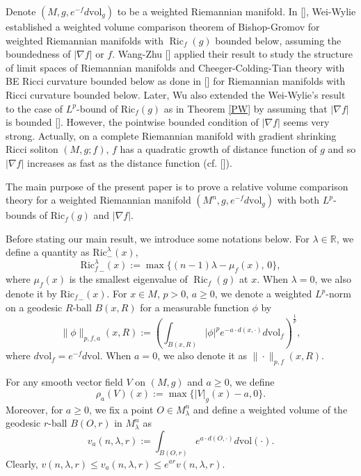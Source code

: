 \documentclass[11pt]{amsart}
\numberwithin{equation}{section}
\newcommand{\vol}{\mathrm{vol}}
\begin{document}
    Denote  $(M,g,e^{-f}d\vol_g)$ to be  a weighted Riemannian manifold.   In [\cite{WW}], Wei-Wylie established a weighted volume comparison theorem of Bishop-Gromov for weighted Riemannian manifolds  with $\operatorname{Ric}_f(g)$  bounded below, assuming the boundedness of $|\nabla f|$ or $f$. Wang-Zhu [\cite{WZ}] applied their result to study the structure of limit  spaces  of Riemannian manifolds   and Cheeger-Colding-Tian theory with BE  Ricci curvature bounded below as done in [\cite{CC, CCT}] for Riemannian manifolds with Ricci curvature  bounded below. Later, Wu also extended the Wei-Wylie's result  to the case of $L^p$-bound of  $\mathrm{Ric}_f(g)$  as in Theorem \ref{PW}  by  assuming  that $|\nabla f|$ is bounded [\cite{Wu}].   However, the pointwise  bounded  condition of  $|\nabla f|$ seems  very strong. Actually, on a complete  Riemannian manifold with gradient shrinking  Ricci soliton  $(M, g; f)$,   $f$ has a  quadratic growth  of  distance  function  of $g$ and so $|\nabla f|$ increases  as fast as the distance function (cf. [\cite{CZ, CQ}]).  

    The main purpose of the present paper is to prove  a relative volume comparison theory  for a weighted Riemannian manifold $(M^n,g,e^{-f}d\mathrm{vol}_g)$ with both  $L^p$-bounds of  $\mathrm{Ric}_f(g)$ and $|\nabla f|$.

    Before stating our main result, we introduce some notations below. For $\lambda\in\mathbb{R}$, we define a quantity as $\mathrm{Ric}^\lambda_-(x)$,
    \[
    {\mathrm{Ric}_f^\lambda}_-(x):=\max\{(n-1)\lambda-\mu_f(x),\,0\},
    \]
    where $\mu_f(x)$ is the smallest eigenvalue of $\operatorname{Ric}_f(g)$ at $x$. When $\lambda=0$, we also denote it by  ${\mathrm{Ric}_f}_-(x)$.  For $x\in M$, $p>0$, $a\geq 0$, we denote  a weighted $L^p$-norm on a geodesic  $R$-ball  $B(x,R)$
    for   a measurable function $\phi$ by
    \[
    \|\phi \|_{p,f,a}(x,R):=\left(\int_{B(x,R)}|\phi|^pe^{-a\cdot d(x, \cdot)}d\mathrm{vol}_{f}\right)^\frac{1}{p},
    \]
    where $d\mathrm{vol}_f=e^{-f}d\mathrm{vol}$. When $a=0$, we also denote it as $\|\cdot\|_{p,f}(x,R)$.

    For any smooth vector field $V$ on $(M,g)$ and $a\geq 0$, we define
    \[
    \rho_a(V)(x):= \max\{|V|_g(x)-a,0\}.
    \]
    Moreover, for $a\geq 0$, we fix a point $O\in M_\lambda^n$ and define a weighted volume of the geodesic $r$-ball $B(O,r)$ in $M_\lambda^n$  as
    \[
    v_a(n,\lambda,r):=\int_{B(O,r)}e^{a\cdot d(O,\cdot)}d\vol(\cdot).
    \]
    Clearly, $v(n,\lambda,r)\leq v_a(n,\lambda
    ,r)\leq e^{ar}v(n,\lambda,r)$.
\end{document}

